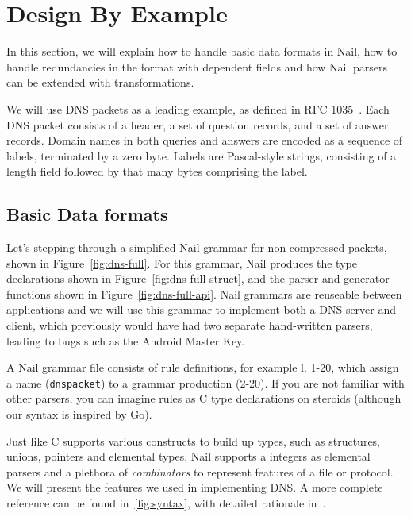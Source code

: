 \section{Design By Example}
In this section, we will explain how to handle basic data formats in Nail, how to handle
redundancies in the format with dependent fields and how Nail parsers can be extended with
transformations. 

We will use DNS packets as a leading example, as defined in RFC 1035~\cite[\S4]{RFC:1035}.  Each DNS packet consists of a
header, a set of question records, and a set of answer records. Domain
names in both queries and answers are encoded as a sequence of labels,
terminated by a zero byte.  Labels are Pascal-style strings, consisting
of a length field followed by that many bytes comprising the label.
\label{s:design}
\subsection{Basic Data formats}


Let's stepping through a simplified Nail grammar for non-compressed
packets, shown in  Figure~\ref{fig:dns-full}.  For this grammar, Nail produces the type declarations
shown in Figure~\ref{fig:dns-full-struct}, and the parser and
generator functions shown in Figure~\ref{fig:dns-full-api}.
Nail grammars are reuseable between applications and we will use this grammar to implement
both a DNS server and client, which previously would have had two separate hand-written parsers,
leading to bugs such as  the Android Master Key. 

A Nail grammar file consists of rule definitions, for example l. 1-20,  which assign a name
(\texttt{dnspacket}) to a grammar production (2-20). If you are not familiar with
other parsers, you can imagine rules as C type declarations on steroids
(although our syntax is inspired by Go).

Just like C supports various constructs to build up types, such as structures, unions, pointers and
elemental types, Nail supports a integers as elemental parsers and a plethora of \emph{combinators}
to represent features of a file or protocol. We will present the features we used in implementing
DNS. A more complete reference can be found in~\ref{fig:syntax}, with detailed rationale in~\cite{bangert:nail-osdi14}.



